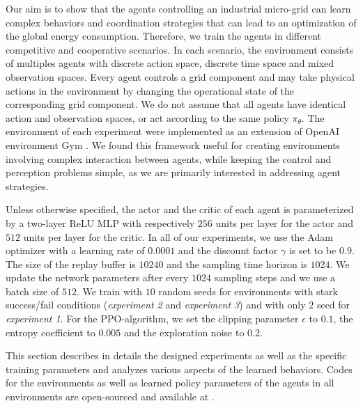 Our aim is to show that the agents controlling an industrial micro-grid can learn complex behaviors and coordination strategies that can lead to an optimization of the global energy consumption. Therefore, we train the agents in different competitive and cooperative scenarios. In each scenario, the environment consists of multiples agents with discrete action space, discrete time space and mixed observation spaces. Every agent controls a grid component and may take physical actions in the environment by changing the operational state of the corresponding grid component. We do not assume that all agents have identical action and observation spaces, or act according to the same policy $\pi_{\theta}$. The environment of each experiment were implemented as an extension of OpenAI environment Gym \cite{Brockman01540}. We found this framework useful for creating environments involving complex interaction between agents, while keeping the control and perception problems simple, as we are primarily interested in addressing agent strategies. 

Unless otherwise specified, the actor and the critic of each agent is parameterized by a two-layer ReLU MLP with respectively $256$ units per layer for the actor and $512$ units per layer for the critic. In all of our experiments, we use the Adam optimizer with a learning rate of $0.0001$ and the discount factor $\gamma$ is set to be $0.9$. The size of the replay buffer is $10240$ and the sampling time horizon is $1024$. We update the network parameters after every $1024$ sampling steps and we use a batch size of $512$. We train with $10$ random seeds for environments with stark success/fail conditions (\textit{experiment 2} and \textit{experiment 3}) and with only $2$ seed for \textit{experiment 1}. For the PPO-algorithm, we set the clipping parameter $\epsilon$ to $0.1$, the entropy coefficient to $0.005$ and the exploration noise to $0.2$.

This section describes in details the designed experiments as well as the specific training parameters and analyzes various aspects of the learned behaviors. Codes for the environments as well as learned policy parameters of the agents in all environments are open-sourced and available at \cite{Bakakeu2019}.

